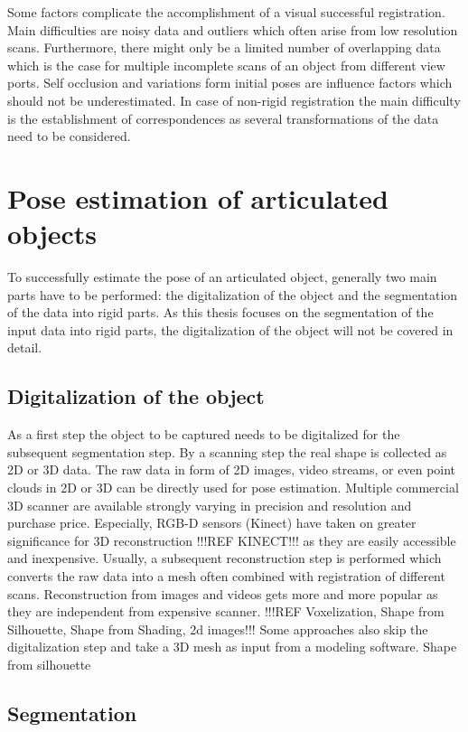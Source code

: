 %
Some factors complicate the accomplishment of a visual successful registration. Main difficulties are noisy data and outliers which often arise from low resolution scans. Furthermore, there might only be a limited number of overlapping data which is the case for multiple incomplete scans of an object from different view ports. Self occlusion and variations form initial poses are influence factors which should not be underestimated. In case of non-rigid registration the main difficulty is the establishment of correspondences as several transformations of the data need to be considered.
%
\section{Pose estimation of articulated objects}

To successfully estimate the pose of an articulated object, generally two main parts have to be performed: the digitalization of the object and the segmentation of the data into rigid parts. As this thesis focuses on the segmentation of the input data into rigid parts, the digitalization of the object will not be covered in detail. 

\subsection{Digitalization of the object}
\label{sec:reconstruction}
As a first step the object to be captured needs to be digitalized for the subsequent segmentation step. By a scanning step the real shape is collected as 2D or 3D data. The raw data in form of 2D images, video streams, or even point clouds in 2D or 3D can be directly used for pose estimation. Multiple commercial 3D scanner are available strongly varying in precision and resolution and purchase price. Especially, RGB-D sensors (Kinect) have taken on greater significance for 3D reconstruction !!!REF KINECT!!! as they are easily accessible and inexpensive. Usually, a subsequent reconstruction step is performed which converts the raw data into a mesh often combined with registration of different scans. Reconstruction from images and videos gets more and more popular as they are independent from expensive scanner. !!!REF
Voxelization, Shape from Silhouette, Shape from Shading, 2d images!!! Some approaches also skip the digitalization step and take a 3D mesh as input from a modeling software. Shape from silhouette \cite{mocap}
%
%
\subsection{Segmentation}
\label{sec:segmentation}

